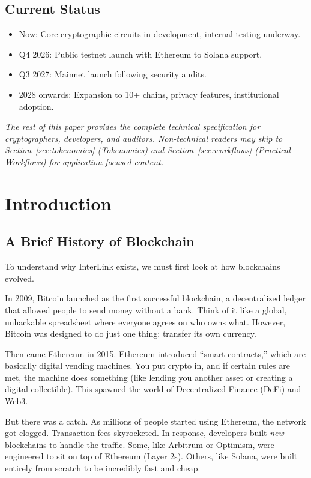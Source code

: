 \documentclass[11pt,a4paper]{article}
\begin{document}
\subsection*{Current Status}

\begin{itemize}
    \item Now: Core cryptographic circuits in development, internal testing underway.
    \item Q4 2026: Public testnet launch with Ethereum to Solana support.
    \item Q3 2027: Mainnet launch following security audits.
    \item 2028 onwards: Expansion to 10+ chains, privacy features, institutional adoption.
\end{itemize}

\textit{The rest of this paper provides the complete technical specification for cryptographers, developers, and auditors. Non-technical readers may skip to Section~\ref{sec:tokenomics} (Tokenomics) and Section~\ref{sec:workflows} (Practical Workflows) for application-focused content.}

\newpage

\section{Introduction}
\label{sec:intro}

\subsection{A Brief History of Blockchain}
To understand why InterLink exists, we must first look at how blockchains evolved. 

In 2009, Bitcoin launched as the first successful blockchain, a decentralized ledger that allowed people to send money without a bank. Think of it like a global, unhackable spreadsheet where everyone agrees on who owns what. However, Bitcoin was designed to do just one thing: transfer its own currency.

Then came Ethereum in 2015. Ethereum introduced ``smart contracts,'' which are basically digital vending machines. You put crypto in, and if certain rules are met, the machine does something (like lending you another asset or creating a digital collectible). This spawned the world of Decentralized Finance (DeFi) and Web3.

But there was a catch. As millions of people started using Ethereum, the network got clogged. Transaction fees skyrocketed. In response, developers built \textit{new} blockchains to handle the traffic. Some, like Arbitrum or Optimism, were engineered to sit on top of Ethereum (Layer 2s). Others, like Solana, were built entirely from scratch to be incredibly fast and cheap. 
\end{document}
